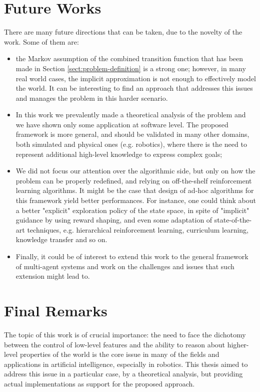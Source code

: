 \section{Future Works}
There are many future directions that can be taken, due to the novelty of the work. Some of them are:
\begin{itemize}
	\item the Markov assumption of the combined transition function that has been made in Section \ref{sect:problem-definition} is a strong one; however, in many real world cases, the implicit approximation is not enough to effectively model the world. It can be interesting to find an approach that addresses this issues and manages the problem in this harder scenario.
	\item In this work we prevalently made a theoretical analysis of the problem and we have shown only some application at software level. The proposed framework is more general, and should be validated in many other domains, both simulated and physical ones (e.g. robotics), where there is the need to represent additional high-level knowledge to express complex goals;
	\item We did not focus our attention over the algorithmic side, but only on how the problem can be properly redefined, and relying on off-the-shelf reinforcement learning algorithms. It might be the case that design of ad-hoc algorithms for this framework yield better performances. For instance, one could think about a better "explicit" exploration policy of the state space, in spite of "implicit" guidance by using reward shaping, and even some adaptation of state-of-the-art techniques, e.g. hierarchical reinforcement learning, curriculum learning, knowledge transfer and so on.
	\item Finally, it could be of interest to extend this work to the general framework of multi-agent systems and work on the challenges and issues that such extension might lead to.
\end{itemize}

\section{Final Remarks}
The topic of this work is of crucial importance: the need to face the dichotomy between the control of low-level features and the ability to reason about higher-level properties of the world is the core issue in many of the fields and applications in artificial intelligence, especially in robotics. This thesis aimed to address this issue in a particular case, by a theoretical analysis, but providing actual implementations as support for the proposed approach.